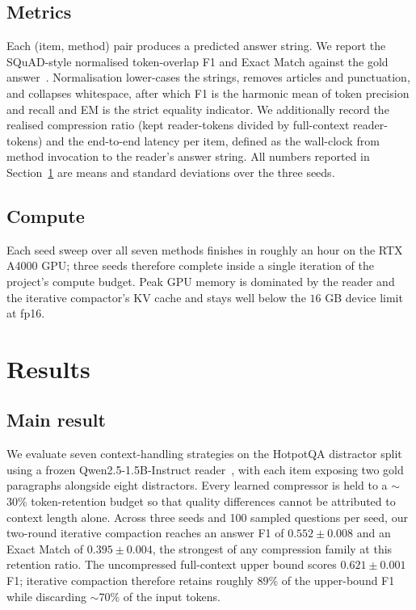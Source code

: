 \documentclass[10pt,twocolumn]{article}
\begin{document}
\subsection{Metrics}
Each (item, method) pair produces a predicted answer string. We report the SQuAD-style normalised token-overlap F1 and Exact Match against the gold answer~\cite{rajpurkar2016squad}. Normalisation lower-cases the strings, removes articles and punctuation, and collapses whitespace, after which F1 is the harmonic mean of token precision and recall and EM is the strict equality indicator. We additionally record the realised compression ratio (kept reader-tokens divided by full-context reader-tokens) and the end-to-end latency per item, defined as the wall-clock from method invocation to the reader's answer string. All numbers reported in Section~\ref{sec:results} are means and standard deviations over the three seeds.

\subsection{Compute}
Each seed sweep over all seven methods finishes in roughly an hour on the RTX A4000 GPU; three seeds therefore complete inside a single iteration of the project's compute budget. Peak GPU memory is dominated by the reader and the iterative compactor's KV cache and stays well below the $16$ GB device limit at fp16.

\section{Results}
\label{sec:results}

\subsection{Main result}
We evaluate seven context-handling strategies on the HotpotQA distractor split~\cite{yang2018hotpotqa} using a frozen Qwen2.5-1.5B-Instruct reader~\cite{qwen2024qwen2_5}, with each item exposing two gold paragraphs alongside eight distractors. Every learned compressor is held to a $\sim$30\% token-retention budget so that quality differences cannot be attributed to context length alone. Across three seeds and 100 sampled questions per seed, our two-round iterative compaction reaches an answer F1 of $\mathbf{0.552 \pm 0.008}$ and an Exact Match of $0.395 \pm 0.004$, the strongest of any compression family at this retention ratio. The uncompressed full-context upper bound scores $0.621 \pm 0.001$ F1; iterative compaction therefore retains roughly $89\%$ of the upper-bound F1 while discarding $\sim$70\% of the input tokens.
\end{document}
